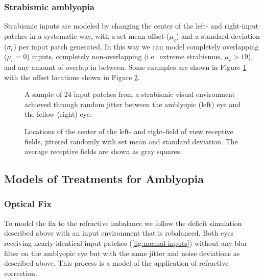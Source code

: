 \documentclass[
  sn-apa,
  pdflatex]{sn-jnl}
\theoremstyle{thmstyleone}%
\theoremstyle{thmstyletwo}%
\theoremstyle{thmstylethree}%
\begin{document}
\hypertarget{strabismic-amblyopia}{%
\subsubsection{Strabismic amblyopia}\label{strabismic-amblyopia}}

Strabismic inputs are modeled by changing the center of the left- and
right-input patches in a systematic way, with a set mean offset
(\(\mu_c\)) and a standard deviation (\(\sigma_c\)) per input patch
generated. In this way we can model completely overlapping (\(\mu_c=0\))
inputs, completely non-overlapping (i.e.~extreme strabismus,
\(\mu_c>19\)), and any amount of overlap in between. Some examples are
shown in Figure \ref{fig:jitter-inputs} with the offset locations shown
in Figure \ref{fig:jitter-input-locations}.

\begin{figure}
\hypertarget{fig:jitter-inputs}{%
\centering

\caption{A sample of 24 input patches from a strabismic visual
environment achieved through random jitter between the amblyopic (left)
eye and the fellow (right) eye.}\label{fig:jitter-inputs}
}
\end{figure}

\begin{figure}
\hypertarget{fig:jitter-input-locations}{%
\centering

\caption{Locations of the center of the left- and right-field of view
receptive fields, jittered randomly with set mean and standard
deviation. The average receptive fields are shown as gray
squares.}\label{fig:jitter-input-locations}
}
\end{figure}

\hypertarget{models-of-treatments-for-amblyopia}{%
\subsection{Models of Treatments for
Amblyopia}\label{models-of-treatments-for-amblyopia}}

\hypertarget{optical-fix}{%
\subsubsection{Optical Fix}\label{optical-fix}}

To model the fix to the refractive imbalance we follow the deficit
simulation described above with an input environment that is rebalanced.
Both eyes receiving nearly identical input patches
(\ref{fig:normal-inputs}) without any blur filter on the amblyopic eye
but with the same jitter and noise deviations as described above. This
process is a model of the application of refractive correction.
\end{document}
